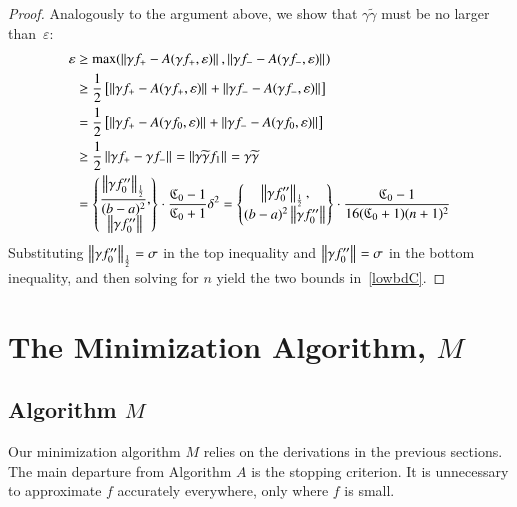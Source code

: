 \documentclass[review]{elsarticle}
\newcommand{\abstol}{\varepsilon}
\theoremstyle{definition}
\newcommand{\tgamma}{\widetilde{\gamma}}
\begin{document}
\begin{proof}
Analogously to the argument above, we show that $\gamma\tgamma$ must be no larger
than~$\abstol$:
	\begin{align*}
	\abstol & \ge \max(\norm{\gamma f_+-A(\gamma f_+,\abstol)},
	\norm{\gamma f_--A(\gamma f_-, \abstol)}) \\
	& \ge \frac{1}{2} \left[ \norm{\gamma f_+-A(\gamma f_+,\abstol)}
	+ \norm{\gamma f_--A(\gamma f_-, \abstol)} \right] \\
	& = \frac{1}{2} \left[ \norm{\gamma f_+-A(\gamma f_0,\abstol)}
	+ \norm{\gamma f_--A(\gamma f_0, \abstol)} \right] \\
	& \ge \frac{1}{2}  \norm{\gamma f_+ - \gamma f_-} =  \norm{\gamma \tgamma f_1}
	= \gamma \tgamma\\
	& = \begin{Bmatrix} \displaystyle
	\frac{\norm[\frac 12]{\gamma f_0''}}{(b-a)^2}, \\
	\norm{\gamma f_0''}
	\end{Bmatrix}  \cdot \frac{\fC_0-1}{\fC_0+1} \delta^2
	 = \begin{Bmatrix} \displaystyle
	\norm[\frac 12]{\gamma f_0''}, \\
	(b-a)^2\norm{\gamma f_0''}
	\end{Bmatrix}  \cdot \frac{\fC_0-1}{16(\fC_0+1)(n+1)^2}
	\end{align*}
	Substituting $\norm[\frac12]{\gamma f_0''} = \sigma$ in the top inequality and
	$\norm{\gamma f_0''} = \sigma$ in the bottom inequality, and then solving for
	$n$ yield the two bounds in~\eqref{lowbdC}.
\end{proof}


\section{The Minimization Algorithm, $M$} \label{sec:funmin}

\subsection{Algorithm $M$}  \label{sec:minalgo}

Our minimization algorithm $M$ relies on the derivations in the previous
sections. The main departure from Algorithm $A$ is the stopping criterion. It is
unnecessary to approximate $f$ accurately everywhere,  only where $f$ is small.
\end{document}
